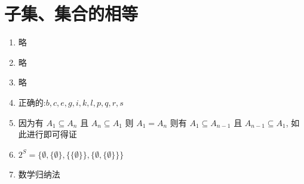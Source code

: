 \documentclass[../../main.tex]{subfiles}
\begin{document}
\section{子集、集合的相等}
\begin{enumerate}
    \item 略
    \item 略
    \item 略
    \item 正确的:\(b,c,e,g,i,k,l,p,q,r,s\)
    \item 因为有 $A_{1} \subseteq A_{n}$ 且 $A_{n} \subseteq A_{1}$ 则 ${A_{1}=A_{n}}$ 则有 $A_{1} \subseteq A_{n-1}$ 且 $A_{n-1} \subseteq A_{1}$, 如此进行即可得证
    \item $2^{S}=\{\emptyset,\{\emptyset\},\{\{\emptyset\}\},\{\emptyset,\{\emptyset\}\}\}$
    \item 数学归纳法
\end{enumerate}
\end{document}
